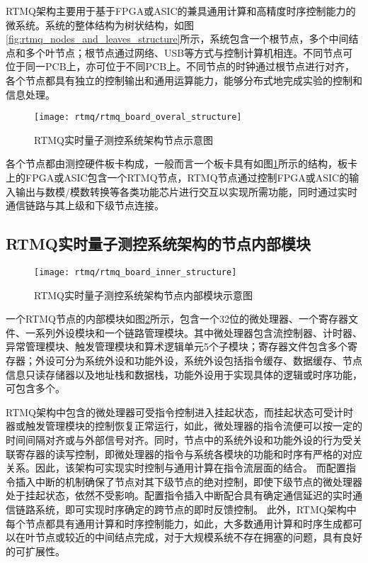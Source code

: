 RTMQ架构主要用于基于FPGA或ASIC的兼具通用计算和高精度时序控制能力的微系统。系统的整体结构为树状结构，如图\ref{fig:rtmq_nodes_and_leaves_structure}所示，系统包含一个根节点，多个中间结点和多个叶节点；根节点通过网络、USB等方式与控制计算机相连。不同节点可位于同一PCB上，亦可位于不同PCB上。不同节点的时钟通过根节点进行对齐，各个节点都具有独立的控制输出和通用运算能力，能够分布式地完成实验的控制和信息处理。

\begin{figure}
    \centering
    \caption[RTMQ实时量子测控系统架构节点示意图]{RTMQ实时量子测控系统架构节点示意图\label{fig:rtmq_board_overal_structure}}
    \texttt{[image: rtmq/rtmq\_board\_overal\_structure]}
\end{figure}

各个节点都由测控硬件板卡构成，一般而言一个板卡具有如图\ref{fig:rtmq_board_overal_structure}所示的结构，板卡上的FPGA或ASIC包含一个RTMQ节点，RTMQ节点通过控制FPGA或ASIC的输入输出与数模/模数转换等各类功能芯片进行交互以实现所需功能，同时通过实时通信链路与其上级和下级节点连接。



\subsection[RTMQ实时量子测控系统架构的节点内部模块]{RTMQ实时量子测控系统架构的节点内部模块\label{section:rtmq_inner_module}}

\begin{figure}
    \centering
    \caption[RTMQ实时量子测控系统架构节点内部模块示意图]{RTMQ实时量子测控系统架构节点内部模块示意图\label{fig:rtmq_board_inner_structure}}
    \texttt{[image: rtmq/rtmq\_board\_inner\_structure]}
\end{figure}

一个RTMQ节点的内部模块如图\ref{fig:rtmq_board_inner_structure}所示，包含一个32位的微处理器、一个寄存器文件、一系列外设模块和一个链路管理模块。其中微处理器包含流控制器、计时器、异常管理模块、触发管理模块和算术逻辑单元5个子模块；寄存器文件包含多个寄存器；外设可分为系统外设和功能外设，系统外设包括指令缓存、数据缓存、节点信息只读存储器以及地址栈和数据栈，功能外设用于实现具体的逻辑或时序功能，可包含多个。

RTMQ架构中包含的微处理器可受指令控制进入挂起状态，而挂起状态可受计时器或触发管理模块的控制恢复正常运行，如此，微处理器的指令流便可以按一定的时间间隔对齐或与外部信号对齐。同时，节点中的系统外设和功能外设的行为受关联寄存器的读写控制，即微处理器的指令与系统各模块的功能和时序有严格的对应关系。因此，该架构可实现实时控制与通用计算在指令流层面的结合。
而配置指令插入中断的机制确保了节点对其下级节点的绝对控制，即使下级节点的微处理器处于挂起状态，依然不受影响。配置指令插入中断配合具有确定通信延迟的实时通信链路系统，即可实现时序确定的跨节点的即时反馈控制。
此外，RTMQ架构中每个节点都具有通用计算和时序控制能力，如此，大多数通用计算和时序生成都可以在叶节点或较近的中间结点完成，对于大规模系统不存在拥塞的问题，具有良好的可扩展性。
